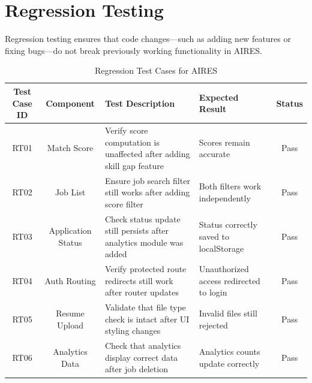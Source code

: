 \section{Regression Testing}
Regression testing ensures that code changes---such as adding new features or fixing bugs---do not break previously working functionality in AIRES.
\begin{table}[H]
    \centering
    \renewcommand{\arraystretch}{1.3}
    \small
    \begin{tabular}{|c|c|p{3cm}|p{3cm}|c|}
        \hline
        \textbf{Test Case ID} & \textbf{Component} & \textbf{Test Description} & \textbf{Expected Result} & \textbf{Status} \\
        \hline
        RT01 & Match Score & \raggedright Verify score computation is unaffected after adding skill gap feature & \raggedright Scores remain accurate & Pass \\
        \hline
        RT02 & Job List & \raggedright Ensure job search filter still works after adding score filter & \raggedright Both filters work independently & Pass \\
        \hline
        RT03 & Application Status & \raggedright Check status update still persists after analytics module was added & \raggedright Status correctly saved to localStorage & Pass \\
        \hline
        RT04 & Auth Routing & \raggedright Verify protected route redirects still work after router updates & \raggedright Unauthorized access redirected to login & Pass \\
        \hline
        RT05 & Resume Upload & \raggedright Validate that file type check is intact after UI styling changes & \raggedright Invalid files still rejected & Pass \\
        \hline
        RT06 & Analytics Data & \raggedright Check that analytics display correct data after job deletion & \raggedright Analytics counts update correctly & Pass \\
        \hline
    \end{tabular}
    \caption{Regression Test Cases for AIRES}
    \label{tab:regression_tests}
\end{table}
\newpage
